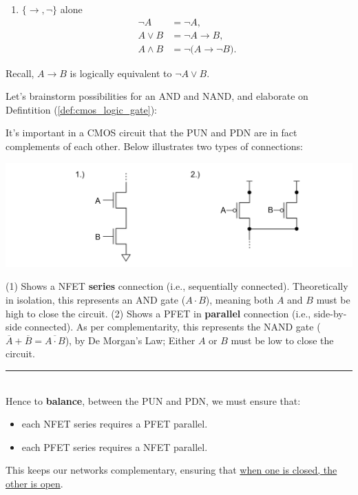 \begin{Example}
\begin{enumerate}
  \item $\{\to,\neg\}$ alone
    \begin{align*}
      \neg A   &= \neg A,\\
      A\lor B  &= \neg A \to B,\\
      A\land B &= \neg\bigl(A \to \neg B\bigr).
    \end{align*}
\end{enumerate}

\noindent
Recall, $A \to B$ is logically equivalent to $\neg A \lor B$. 
\end{Example}

\newpage 

\noindent
Let's brainstorm possibilities for an AND and NAND, and elaborate on Defintition (\ref{def:cmos_logic_gate}):
\begin{theo}

  \label{theo:balancing_series_parallel}

    \noindent
    It's important in a CMOS circuit that the PUN and PDN are in fact complements of each other. Below
    illustrates two types of connections:

    \begin{center}
      \includegraphics[width=\textwidth]{Sections/circuits/np_comp.png}
    \end{center}

    \noindent
    (1) Shows a NFET \textbf{series} connection (i.e., sequentially connected). Theoretically in isolation, this represents
    an AND gate ($A \cdot B$), meaning both $A$ and $B$ must be high to close the circuit. (2) Shows a PFET in \textbf{parallel} connection (i.e., side-by-side connected). As per complementarity, this represents the NAND gate
    ($\overline{A} + \overline{B} = \overline{A \cdot B}$), by De Morgan's Law; Either $A$ or $B$ must be low to close the circuit.\\
    \rule{\textwidth}{0.4pt}\\
    \noindent
    Hence to \textbf{balance}, between the PUN and PDN, we must ensure that:
    \begin{itemize}
        \item each NFET series requires a PFET parallel.
        \item each PFET series requires a NFET parallel.
    \end{itemize}

    \noindent
    This keeps our networks complementary, ensuring that \underline{when one is closed, the other is open}.
\end{theo}

